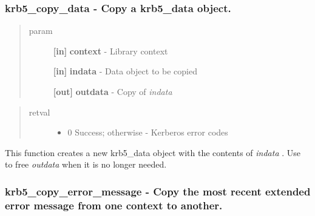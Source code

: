 \documentclass[letterpaper,10pt,english]{sphinxmanual}
\begin{document}
\subsubsection{krb5\_copy\_data -  Copy a krb5\_data object.}
\label{appdev/refs/api/krb5_copy_data:krb5-copy-data-copy-a-krb5-data-object}\label{appdev/refs/api/krb5_copy_data::doc}

\begin{fulllineitems}
\label{appdev/refs/api/krb5_copy_data:krb5_copy_data}
\end{fulllineitems}

\begin{quote}\begin{description}
\item[{param}] \leavevmode
\textbf{{[}in{]}} \textbf{context} - Library context

\textbf{{[}in{]}} \textbf{indata} - Data object to be copied

\textbf{{[}out{]}} \textbf{outdata} - Copy of \emph{indata}

\end{description}\end{quote}
\begin{quote}\begin{description}
\item[{retval}] \leavevmode\begin{itemize}
\item {} 
0   Success; otherwise - Kerberos error codes

\end{itemize}

\end{description}\end{quote}

This function creates a new krb5\_data object with the contents of \emph{indata} . Use {\hyperref[appdev/refs/api/krb5_free_data:krb5_free_data]{}} to free \emph{outdata} when it is no longer needed.


\subsubsection{krb5\_copy\_error\_message -  Copy the most recent extended error message from one context to another.}
\label{appdev/refs/api/krb5_copy_error_message:krb5-copy-error-message-copy-the-most-recent-extended-error-message-from-one-context-to-another}\label{appdev/refs/api/krb5_copy_error_message::doc}
\end{document}
